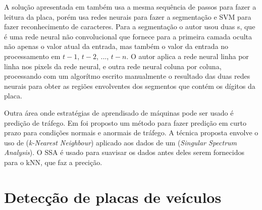 A solução apresentada em
\cite{kim2000learning} também usa a mesma sequência de
passos para fazer a leitura da placa, porém usa redes neurais para 
fazer a segmentação e SVM para fazer reconhecimento de caracteres. Para a
segmentação o autor usou duas
s, que é uma rede neural não convolucional que
fornece para a primeira camada oculta não apenas o valor atual da entrada, mas
também o valor da entrada no processamento em $t-1$, $t-2$, ..., $t-n$. O autor
aplica a rede neural linha por linha nos pixels da rede neural, e outra rede
neural coluna por coluna, processando com um algorítmo escrito manualmente o
resultado das duas redes neurais para obter as regiões envolventes dos
segmentos que contém os dígitos da placa.

Outra área onde estratégias de aprendisado de máquinas pode ser usado é
predição de tráfego. Em \cite{guo2012short} foi proposto um método para fazer
predição em curto prazo para condições normais e anormais de tráfego. A técnica
proposta envolve o uso de  (\emph{k-Nearest Neighbour}) aplicado aos dados de um
(\emph{Singular Spectrum Analysis}). O SSA é usado para suavisar os dados antes
deles serem fornecidos para o kNN, que faz a precição.

\section{Detecção de placas de veículos}


